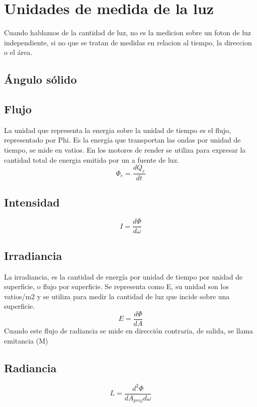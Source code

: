 \section{Unidades de medida de la luz}
    Cuando hablamos de la cantidad de luz, no es la medicion sobre un foton de luz independiente, si no que se tratan de medidas en relacion
    al tiempo, la direccion o el \'area.

    \subsection{\'Angulo s\'olido}

    \subsection{Flujo}
        La unidad que representa la energia sobre la unidad de tiempo es el flujo, representado por Phi. Es la energía que transportan las ondas
        por unidad de tiempo, se mide en vatios. En los motores de render se utiliza para expresar la cantidad total de energia emitida por un a fuente de luz.
        \begin{equation}
            \Phi_e = \dfrac{d{Q_e}}{dt}
        \end{equation}
        \singlespacing

    \subsection{Intensidad}
        \begin{equation}
            I = \dfrac{d\Phi}{d\omega}
        \end{equation}
        \singlespacing

    \subsection{Irradiancia}
        La irradiancia, es la cantidad de energ\'ia por unidad de tiempo por unidad de superficie, o flujo por superficie. Se representa como
        E, su unidad son los vatios/m2 y se utiliza para medir la cantidad de luz que incide sobre una superficie.
        \begin{equation}
            E = \dfrac{d\Phi}{dA}
        \end{equation}
        Cuando este flujo de radiancia se mide en direcci\'on contraria, de salida, se llama emitancia (M)
        \singlespacing

    \subsection{Radiancia}
        \begin{equation}
            L = \dfrac{d^2\Phi}{dA_{proj}d\omega}
        \end{equation}


